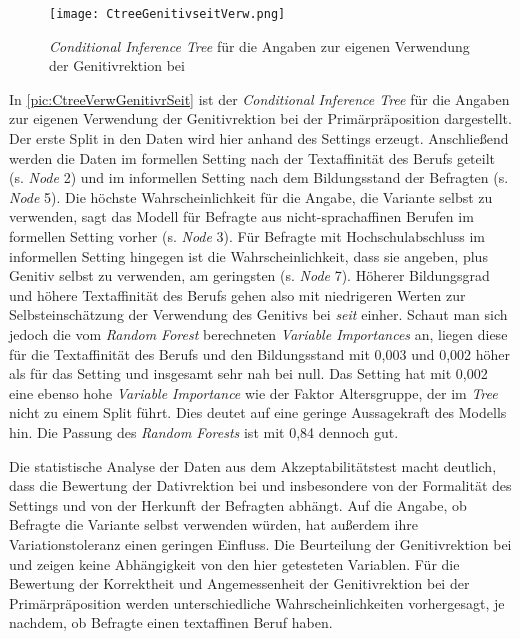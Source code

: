 \begin{figure}[p]
\centering
\texttt{[image: CtreeGenitivseitVerw.png]}
\caption{\textit{Conditional Inference Tree} für die Angaben zur eigenen Verwendung der Genitivrektion bei }
\label{pic:CtreeVerwGenitivrSeit}
\end{figure}

In \autoref{pic:CtreeVerwGenitivrSeit} ist der \textit{Conditional Inference Tree} für die Angaben zur eigenen Verwendung der Genitivrektion bei der Primärpräposition  dargestellt. 
Der erste Split in den Daten wird hier anhand des Settings erzeugt. 
Anschließend werden die Daten im formellen Setting nach der Textaffinität des Berufs geteilt (s. \textit{Node} 2) und im informellen Setting nach dem Bildungsstand der Befragten (s. \textit{Node} 5). 
Die höchste Wahrscheinlichkeit für die Angabe, die Variante selbst zu verwenden, sagt das Modell für Befragte aus nicht-sprachaffinen Berufen im formellen Setting vorher (s. \textit{Node} 3). 
Für Befragte mit Hochschulabschluss im informellen Setting hingegen ist die Wahrscheinlichkeit, dass sie angeben,  plus Genitiv selbst zu verwenden, am geringsten (s. \textit{Node} 7). 
Höherer Bildungsgrad und höhere Textaffinität des Berufs gehen also mit niedrigeren Werten zur Selbsteinschätzung der Verwendung des Genitivs bei \textit{seit} einher. 
Schaut man sich jedoch die vom \textit{Random Forest} berechneten \textit{Variable Importances} an, liegen diese für die Textaffinität des Berufs und den Bildungsstand mit 0,003 und 0,002 höher als für das Setting und insgesamt sehr nah bei null.
Das Setting hat mit 0,002 eine ebenso hohe \textit{Variable Importance} wie der Faktor \glqq Altersgruppe\grqq, der im \textit{Tree} nicht zu einem Split führt. 
Dies deutet auf eine geringe Aussagekraft des Modells hin. 
Die Passung des \textit{Random Forests} ist mit 0,84 dennoch gut.

Die statistische Analyse der Daten aus dem Akzeptabilitätstest macht deutlich, dass die Bewertung der Dativrektion bei \wegen{} und \waehrend{} insbesondere von der Formalität des Settings und von der Herkunft der Befragten abhängt.
Auf die Angabe, ob Befragte die Variante selbst verwenden würden, hat außerdem ihre Variationstoleranz einen geringen Einfluss. 
Die Beurteilung der Genitivrektion bei \dank{} und \gegenueber{} zeigen keine Abhängigkeit von den hier getesteten Variablen.
Für die Bewertung der Korrektheit und Angemessenheit der Genitivrektion bei der Primärpräposition  werden unterschiedliche Wahrscheinlichkeiten vorhergesagt, je nachdem, ob Befragte einen textaffinen Beruf haben.  

